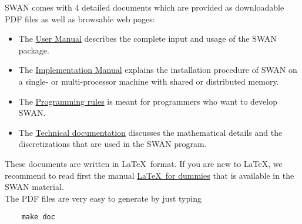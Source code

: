 \documentclass[12pt]{book}
\begin{document}
SWAN comes with 4 detailed documents which are provided as downloadable PDF files as well as browsable web pages:
\begin{itemize}
  \item The \underline{User Manual} describes the complete input and usage of the SWAN package.
  \item The \underline{Implementation Manual} explains the installation procedure of SWAN on a single- or multi-processor machine
        with shared or distributed memory.
  \item The \underline{Programming rules} is meant for programmers who want to develop SWAN.
  \item The \underline{Technical documentation} discusses the mathematical details and the discretizations that are used in the SWAN program.
\end{itemize}
These documents are written in \LaTeX~format. If you are new to \LaTeX, we recommend to read first the manual \underline{\LaTeX~for dummies}
that is available in the SWAN material.
\\[2ex]
\noindent
The PDF files are very easy to generate by just typing
\begin{verbatim}
    make doc
\end{verbatim}

 \label{ch:usechan}
\end{document}
